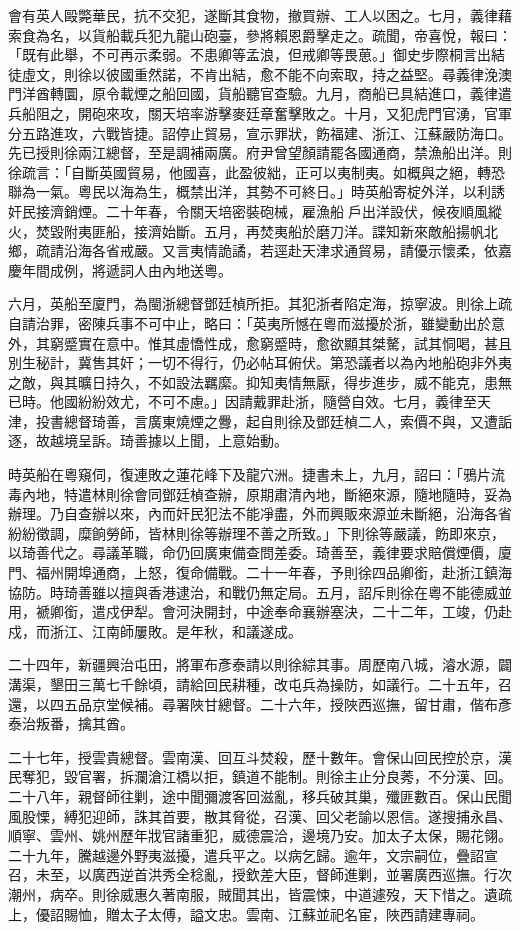 \begin{pinyinscope}
會有英人毆斃華民，抗不交犯，遂斷其食物，撤買辦、工人以困之。七月，義律藉索食為名，以貨船載兵犯九龍山砲臺，參將賴恩爵擊走之。疏聞，帝喜悅，報曰：「既有此舉，不可再示柔弱。不患卿等孟浪，但戒卿等畏葸。」御史步際桐言出結徒虛文，則徐以彼國重然諾，不肯出結，愈不能不向索取，持之益堅。尋義律浼澳門洋酋轉圜，原令載煙之船回國，貨船聽官查驗。九月，商船已具結進口，義律遣兵船阻之，開砲來攻，關天培率游擊麥廷章奮擊敗之。十月，又犯虎門官湧，官軍分五路進攻，六戰皆捷。詔停止貿易，宣示罪狀，飭福建、浙江、江蘇嚴防海口。先已授則徐兩江總督，至是調補兩廣。府尹曾望顏請罷各國通商，禁漁船出洋。則徐疏言：「自斷英國貿易，他國喜，此盈彼絀，正可以夷制夷。如概與之絕，轉恐聯為一氣。粵民以海為生，概禁出洋，其勢不可終日。」時英船寄椗外洋，以利誘奸民接濟銷煙。二十年春，令關天培密裝砲械，雇漁船戶出洋設伏，候夜順風縱火，焚毀附夷匪船，接濟始斷。五月，再焚夷船於磨刀洋。諜知新來敵船揚帆北鄉，疏請沿海各省戒嚴。又言夷情詭譎，若逕赴天津求通貿易，請優示懷柔，依嘉慶年間成例，將遞詞人由內地送粵。

六月，英船至廈門，為閩浙總督鄧廷楨所拒。其犯浙者陷定海，掠寧波。則徐上疏自請治罪，密陳兵事不可中止，略曰：「英夷所憾在粵而滋擾於浙，雖變動出於意外，其窮蹙實在意中。惟其虛憍性成，愈窮蹙時，愈欲顯其桀驁，試其恫喝，甚且別生秘計，冀售其奸；一切不得行，仍必帖耳俯伏。第恐議者以為內地船砲非外夷之敵，與其曠日持久，不如設法羈縻。抑知夷情無厭，得步進步，威不能克，患無已時。他國紛紛效尤，不可不慮。」因請戴罪赴浙，隨營自效。七月，義律至天津，投書總督琦善，言廣東燒煙之釁，起自則徐及鄧廷楨二人，索價不與，又遭詬逐，故越境呈訴。琦善據以上聞，上意始動。

時英船在粵窺伺，復連敗之蓮花峰下及龍穴洲。捷書未上，九月，詔曰：「鴉片流毒內地，特遣林則徐會同鄧廷楨查辦，原期肅清內地，斷絕來源，隨地隨時，妥為辦理。乃自查辦以來，內而奸民犯法不能凈盡，外而興販來源並未斷絕，沿海各省紛紛徵調，糜餉勞師，皆林則徐等辦理不善之所致。」下則徐等嚴議，飭即來京，以琦善代之。尋議革職，命仍回廣東備查問差委。琦善至，義律要求賠償煙價，廈門、福州開埠通商，上怒，復命備戰。二十一年春，予則徐四品卿銜，赴浙江鎮海協防。時琦善雖以擅與香港逮治，和戰仍無定局。五月，詔斥則徐在粵不能德威並用，褫卿銜，遣戍伊犁。會河決開封，中途奉命襄辦塞決，二十二年，工竣，仍赴戍，而浙江、江南師屢敗。是年秋，和議遂成。

二十四年，新疆興治屯田，將軍布彥泰請以則徐綜其事。周歷南八城，濬水源，闢溝渠，墾田三萬七千餘頃，請給回民耕種，改屯兵為操防，如議行。二十五年，召還，以四五品京堂候補。尋署陜甘總督。二十六年，授陜西巡撫，留甘肅，偕布彥泰治叛番，擒其酋。

二十七年，授雲貴總督。雲南漢、回互斗焚殺，歷十數年。會保山回民控於京，漢民奪犯，毀官署，拆瀾滄江橋以拒，鎮道不能制。則徐主止分良莠，不分漢、回。二十八年，親督師往剿，途中聞彌渡客回滋亂，移兵破其巢，殲匪數百。保山民聞風股慄，縛犯迎師，誅其首要，散其脅從，召漢、回父老諭以恩信。遂搜捕永昌、順寧、雲州、姚州歷年戕官諸重犯，威德震洽，邊境乃安。加太子太保，賜花翎。二十九年，騰越邊外野夷滋擾，遣兵平之。以病乞歸。逾年，文宗嗣位，疊詔宣召，未至，以廣西逆首洪秀全稔亂，授欽差大臣，督師進剿，並署廣西巡撫。行次潮州，病卒。則徐威惠久著南服，賊聞其出，皆震悚，中道遽歿，天下惜之。遺疏上，優詔賜恤，贈太子太傅，謚文忠。雲南、江蘇並祀名宦，陜西請建專祠。


\end{pinyinscope}

